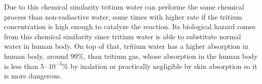 Due to this chemical similarity tritium water can performe the same chemical process than non-radiactive water, some times with higher rate if the tritium concentration is high enough to catalyze the reaction. Its biological hazard comes from this chemical similarity since tritium water is able to substitute normal water in human body. On top of that, tritium water has a higher absorption in human body, around 99\%, than tritium gas, whose absorption in the human body is less than $5 \cdot 10^{-3}\%$  by inalation or practically negligible by skin absorption \cite{TritiumHandling} so it is more dangerous.